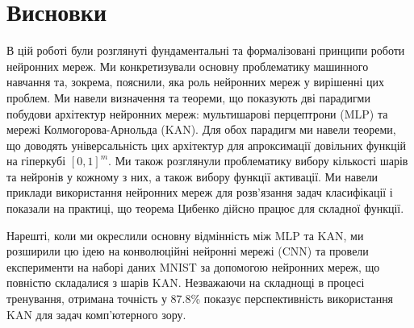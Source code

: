 \chapter*{Висновки}

\hspace{\parindent} В цій роботі були розглянуті фундаментальні та формалізовані
принципи роботи нейронних мереж. Ми конкретизували основну проблематику 
машинного навчання та, зокрема, пояснили, яка роль нейронних мереж у вирішенні цих
проблем. Ми навели визначення та теореми, що показують дві парадигми 
побудови архітектур нейронних мереж: мультишарові перцептрони (MLP) та 
мережі Колмогорова-Арнольда (KAN). Для обох парадигм ми навели теореми,
що доводять універсальність цих архітектур для апроксимації довільних 
функцій на гіперкубі $[0, 1]^m$. Ми також розглянули проблематику
вибору кількості шарів та нейронів у кожному з них, а також вибору
функції активації. Ми навели приклади використання нейронних мереж для
розв'язання задач класифікації і показали на практиці, що теорема 
Цибенко дійсно працює для складної функції. 

Нарешті, коли ми окреслили основну відмінність між MLP та KAN, ми розширили цю
ідею на конволюційні нейронні мережі (CNN) та провели експерименти на наборі
даних MNIST за допомогою нейронних мереж, що повністю складалися з шарів KAN.
Незважаючи на складнощі в процесі тренування, отримана точність у 87.8\% показує
перспективність використання KAN для задач комп'ютерного зору.
